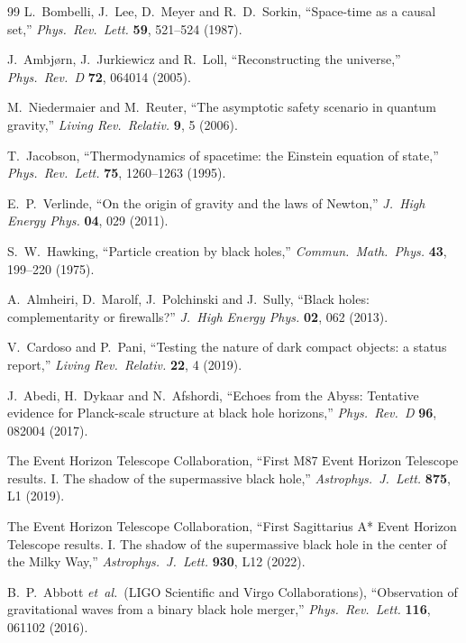 \documentclass[a4paper]{article}
\begin{document}
\begin{thebibliography}{99}
L.~Bombelli, J.~Lee, D.~Meyer and R.~D.~Sorkin,
``Space-time as a causal set,''
\textit{Phys.\ Rev.\ Lett.} \textbf{59}, 521--524 (1987).

J.~Ambj{\o}rn, J.~Jurkiewicz and R.~Loll,
``Reconstructing the universe,''
\textit{Phys.\ Rev.\ D} \textbf{72}, 064014 (2005).

M.~Niedermaier and M.~Reuter,
``The asymptotic safety scenario in quantum gravity,''
\textit{Living Rev.\ Relativ.} \textbf{9}, 5 (2006).

T.~Jacobson,
``Thermodynamics of spacetime: the Einstein equation of state,''
\textit{Phys.\ Rev.\ Lett.} \textbf{75}, 1260--1263 (1995).

E.~P.~Verlinde,
``On the origin of gravity and the laws of Newton,''
\textit{J.\ High Energy Phys.} \textbf{04}, 029 (2011).

S.~W.~Hawking,
``Particle creation by black holes,''
\textit{Commun.\ Math.\ Phys.} \textbf{43}, 199--220 (1975).

A.~Almheiri, D.~Marolf, J.~Polchinski and J.~Sully,
``Black holes: complementarity or firewalls?''
\textit{J.\ High Energy Phys.} \textbf{02}, 062 (2013).

V.~Cardoso and P.~Pani,
``Testing the nature of dark compact objects: a status report,''
\textit{Living Rev.\ Relativ.} \textbf{22}, 4 (2019).

J.~Abedi, H.~Dykaar and N.~Afshordi,
``Echoes from the Abyss: Tentative evidence for Planck-scale structure at black hole horizons,''
\textit{Phys.\ Rev.\ D} \textbf{96}, 082004 (2017).

The Event Horizon Telescope Collaboration,
``First M87 Event Horizon Telescope results. I. The shadow of the supermassive black hole,''
\textit{Astrophys.\ J.\ Lett.} \textbf{875}, L1 (2019).

The Event Horizon Telescope Collaboration,
``First Sagittarius A* Event Horizon Telescope results. I. The shadow of the supermassive black hole in the center of the Milky Way,''
\textit{Astrophys.\ J.\ Lett.} \textbf{930}, L12 (2022).

B.~P.~Abbott \textit{et~al.}\ (LIGO Scientific and Virgo Collaborations),
``Observation of gravitational waves from a binary black hole merger,''
\textit{Phys.\ Rev.\ Lett.} \textbf{116}, 061102 (2016).


\end{thebibliography}
\end{document}
